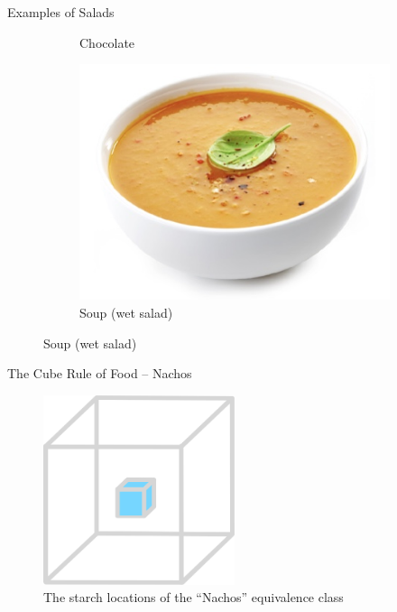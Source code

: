 \documentclass{beamer}
\begin{document}
\begin{frame}{Examples of Salads}
\begin{figure}
\begin{subfigure}{.35\textwidth}
          \caption{\label{fig:chocolate}Chocolate}
        \end{subfigure}%
        \begin{subfigure}{.35\textwidth}
          \centering
          \includegraphics[width=.8\linewidth]{salad/31_soup.jpg}
          \caption{\label{fig:soup}Soup (wet salad)}
        \end{subfigure}
    \end{figure}
\end{frame}

\begin{frame}{The Cube Rule of Food -- Nachos}
    \begin{figure}
        \includegraphics[width=0.5\textwidth]{nachos/34_nachos.png}
        \caption{\label{fig:nachos-diagram}The starch locations of the ``Nachos'' equivalence class}
    \end{figure}
\end{frame}
\end{document}
